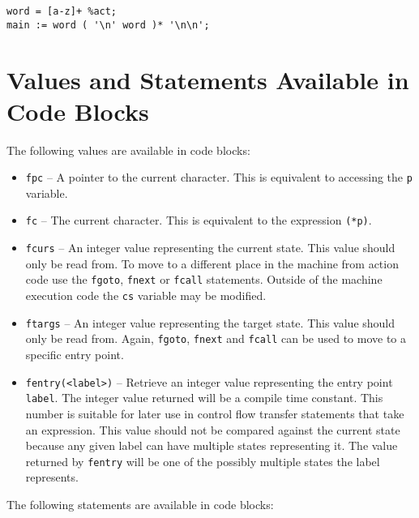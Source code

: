 \documentclass[letterpaper,11pt,oneside]{book}
\newcommand{\verbspace}{\vspace{10pt}}
\begin{document}
\verbspace
\begin{verbatim}
word = [a-z]+ %act;
main := word ( '\n' word )* '\n\n';
\end{verbatim}

\section{Values and Statements Available in Code Blocks}
\label{vals}

\noindent The following values are available in code blocks:

\begin{itemize}
\item \verb|fpc| -- A pointer to the current character. This is equivalent to
accessing the \verb|p| variable.

\item \verb|fc| -- The current character. This is equivalent to the expression \verb|(*p)|.

\item \verb|fcurs| -- An integer value representing the current state. This
value should only be read from. To move to a different place in the machine
from action code use the \verb|fgoto|, \verb|fnext| or \verb|fcall| statements.
Outside of the machine execution code the \verb|cs| variable may be modified.

\item \verb|ftargs| -- An integer value representing the target state. This
value should only be read from. Again, \verb|fgoto|, \verb|fnext| and
\verb|fcall| can be used to move to a specific entry point.

\item \verb|fentry(<label>)| -- Retrieve an integer value representing the
entry point \verb|label|. The integer value returned will be a compile time
constant. This number is suitable for later use in control flow transfer
statements that take an expression. This value should not be compared against
the current state because any given label can have multiple states representing
it. The value returned by \verb|fentry| will be one of the possibly multiple states the
label represents.
\end{itemize}

\noindent The following statements are available in code blocks:
\end{document}
